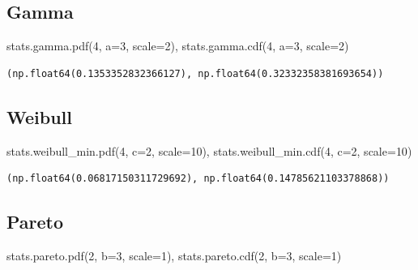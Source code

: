 \documentclass[
  letterpaper,
  DIV=11,
  numbers=noendperiod]{scrreprt}
\newenvironment{Shaded}{\begin{snugshade}}{\end{snugshade}}
\newcommand{\DecValTok}[1]{\textcolor[rgb]{0.68,0.00,0.00}{#1}}
\newcommand{\NormalTok}[1]{\textcolor[rgb]{0.00,0.23,0.31}{#1}}
\newcommand{\OperatorTok}[1]{\textcolor[rgb]{0.37,0.37,0.37}{#1}}
\begin{document}
\subsection{Gamma}\label{gamma}

\begin{Shaded}
\begin{Highlighting}[]
\NormalTok{stats.gamma.pdf(}\DecValTok{4}\NormalTok{, a}\OperatorTok{=}\DecValTok{3}\NormalTok{, scale}\OperatorTok{=}\DecValTok{2}\NormalTok{), stats.gamma.cdf(}\DecValTok{4}\NormalTok{, a}\OperatorTok{=}\DecValTok{3}\NormalTok{, scale}\OperatorTok{=}\DecValTok{2}\NormalTok{)}
\end{Highlighting}
\end{Shaded}

\begin{verbatim}
(np.float64(0.1353352832366127), np.float64(0.32332358381693654))
\end{verbatim}

\subsection{Weibull}\label{weibull}

\begin{Shaded}
\begin{Highlighting}[]
\NormalTok{stats.weibull\_min.pdf(}\DecValTok{4}\NormalTok{, c}\OperatorTok{=}\DecValTok{2}\NormalTok{, scale}\OperatorTok{=}\DecValTok{10}\NormalTok{), stats.weibull\_min.cdf(}\DecValTok{4}\NormalTok{, c}\OperatorTok{=}\DecValTok{2}\NormalTok{, scale}\OperatorTok{=}\DecValTok{10}\NormalTok{)}
\end{Highlighting}
\end{Shaded}

\begin{verbatim}
(np.float64(0.06817150311729692), np.float64(0.14785621103378868))
\end{verbatim}

\subsection{Pareto}\label{pareto}

\begin{Shaded}
\begin{Highlighting}[]
\NormalTok{stats.pareto.pdf(}\DecValTok{2}\NormalTok{, b}\OperatorTok{=}\DecValTok{3}\NormalTok{, scale}\OperatorTok{=}\DecValTok{1}\NormalTok{), stats.pareto.cdf(}\DecValTok{2}\NormalTok{, b}\OperatorTok{=}\DecValTok{3}\NormalTok{, scale}\OperatorTok{=}\DecValTok{1}\NormalTok{)}
\end{Highlighting}
\end{Shaded}
\end{document}

